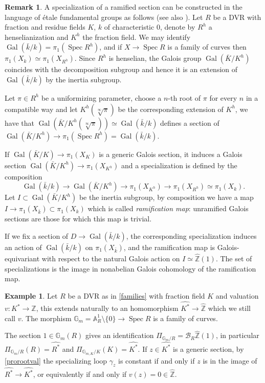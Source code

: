 \documentclass[11pt]{amsart}
\theoremstyle{plain}
\theoremstyle{definition}
\newtheorem{remark}[theorem]{Remark}
\newtheorem{example}[theorem]{Example}
\newcommand{\on}{\operatorname}
\newcommand{\1}{\mathbb{1}}
\newcommand{\A}{\mathbb{A}}
\newcommand{\gal}{\on{Gal}}
\newcommand{\G}{\mathbb{G}}
\newcommand{\hz}{\hat{\mathbb{Z}}}
\newcommand{\spec}{\on{Spec}}
\newcommand{\Z}{\mathbb{Z}}
\renewcommand{\hat}{\widehat}
\newcommand\cB{\mathcal{B}}
\begin{document}
\begin{remark}
	A specialization of a ramified section can be constructed in the language of étale fundamental groups as follows (see also \cite[Corollary 89]{sti13}). Let $R$ be a DVR with fraction and residue fields $K$, $k$ of characteristic $0$, denote by $R^{h}$ a henselianization and $K^{h}$ the fraction field. We may identify $\gal(\bar{k}/k)=\pi_{1}(\spec R^{h})$, and if $X\to \spec R$ is a family of curves then $\pi_{1}(X_{k})\simeq\pi_{1}(X_{R^{h}})$. Since $R^{h}$ is henselian, the Galois group $\gal(\bar{K}/K^{h})$ coincides with the decomposition subgroup and hence it is an extension of $\gal(\bar{k}/k)$ by the inertia subgroup.
	
	Let $\pi\in R^{h}$ be a uniformizing parameter, choose a $n$-th root of $\pi$ for every $n$ in a compatible way and let $K^{h}(\sqrt[\infty]{\pi})$ be the corresponding extension of $K^{h}$, we have that $\gal(\bar{K}/K^{h}(\sqrt[\infty]{\pi}))\simeq\gal(\bar{k}/k)$ defines a section of $\gal(\bar{K}/K^{h})\to\pi_{1}(\spec R^{h})=\gal(\bar{k}/k)$.
	 
	
	If $\gal(\bar{K}/K)\to\pi_{1}(X_{K})$ is a generic Galois section, it induces a Galois section $\gal(\bar{K}/K^{h})\to\pi_{1}(X_{K^{h}})$ and a specialization is defined by the composition
	\[\gal(\bar{k}/k)\to \gal(\bar{K}/K^{h})\to \pi_{1}(X_{K^{h}})\to\pi_{1}(X_{R^{h}})\simeq\pi_{1}(X_{k}).\]
	Let $I\subset \gal(\bar{K}/K^{h})$ be the inertia subgroup, by composition we have a map $I\to\pi_{1}(X_{\bar{k}})\subset\pi_{1}(X_{k})$ which is called \emph{ramification map}: unramified Galois sections are those for which this map is trivial. 
	
	If we fix a section of $D\to\gal(\bar{k}/k)$, the corresponding specialization induces an action of $\gal(\bar{k}/k)$ on $\pi_{1}(X_{\bar{k}})$, and the ramification map is Galois-equivariant with respect to the natural Galois action on $I\simeq\hz(1)$. The set of specializations is the image in nonabelian Galois cohomology of the ramification map. 
	
\end{remark}

\begin{example}\label{gmloop}
	Let $R$ be a DVR as in \autoref{families} with fraction field $K$ and valuation $v:K^{*}\to\Z$, this extends naturally to an homomorphism $\hat{K^{*}}\to\hz$ which we still call $v$. The morphism $\G_{m}=\A^{1}_{R}\setminus\{0\}\to \spec R$ is a family of curves.
	
	The section $1\in\G_{m}(R)$ gives an identification $\Pi_{\G_{m}/R}=\cB_{R}\hz(1)$, in particular $\Pi_{\G_{m}/R}(R)=\hat{R^*}$ and $\Pi_{\G_{m,K}/K}(K)=\hat{K^*}$. If $z\in\hat{K^{*}}$ is a generic section, by \autoref{prorootval} the specializing loop $\gamma_{z}$ is constant if and only if $z$ is in the image of $\hat{R^{*}}\to\hat{K^{*}}$, or equivalently if and only if $v(z)=0\in\hz$.
\end{example}
\end{document}
